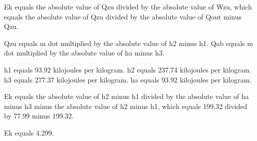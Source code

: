 Ek equals the absolute value of Qzu divided by the absolute value of Wzu, which equals the absolute value of Qzu divided by the absolute value of Qout minus Qzu.  

Qzu equals m dot multiplied by the absolute value of h2 minus h1.  
Qab equals m dot multiplied by the absolute value of ha minus h3.  

h1 equals 93.92 kilojoules per kilogram.  
h2 equals 237.74 kilojoules per kilogram.  
h3 equals 277.37 kilojoules per kilogram.  
ha equals 93.92 kilojoules per kilogram.  

Ek equals the absolute value of h2 minus h1 divided by the absolute value of ha minus h3 minus the absolute value of h2 minus h1, which equals 199.32 divided by 77.99 minus 199.32.  

Ek equals 4.299.